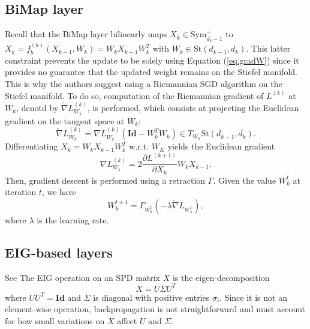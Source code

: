 \documentclass[10pt,a4paper]{book}
\theoremstyle{definition}
\theoremstyle{plain}
\theoremstyle{remark}
\newcommand{\Id}{\mathrm{\textbf{Id}}}
\newcommand \Stif {\textrm{St}}
\begin{document}
\subsection{BiMap layer}
Recall that the BiMap layer bilinearly maps $X_k \in \text{Sym}_{d_k-1}^{+}$ to $X_k=f_{b}^{(k)}(X_{k-1},W_k)=W_kX_{k-1}W_k^T$ with 
$W_k \in \Stif(d_{k-1},d_k)$. This latter constraint prevents the update to be solely using Equation (\ref{eq.gradW}) since it provides no guarantee that the updated weight remains on the Stiefel manifold.
This is why the authors suggest using a Riemannian SGD algorithm on the Stiefel manifold.
To do so, computation of the Riemannian gradient of $L^{(k)}$ at $W_k$, denotd by $\tilde{\nabla} L^{(k)}_{W_k}$, is performed, which consists at projecting the Euclidean gradient on the tangent space at $W_k$:
$$\tilde{\nabla} L^{(k)}_{W_k}=\nabla L^{(k)}_{W_k}(\Id-W_k^T W_k) \in T_{W_k}\Stif(d_{k-1},d_k).$$
Differentiating $X_k=W_kX_{k-1}W_k^T$ w.r.t. $W_K$ yields the Euclidean gradient
$$\nabla L^{(k)}_{W_k}=2 \frac{\partial L^{(k+1)}}{\partial X_k}W_k X_{k-1}.$$
Then, gradient descent is performed using a retraction $\Gamma$. Given the value $W_k^{t}$ at iteration $t$, we have
$$W_{k}^{t+1}=\Gamma_{W_k^{t}}(-\lambda \tilde{\nabla}L_{W_k^t}),$$
where $\lambda$ is the learning rate.

\subsection{EIG-based layers}
See \cite{ionescu2015matrix}
The EIG operation on an SPD matrix $X$ is the eigen-decomposition 
\begin{equation}\label{eq.eig}
    X=U\Sigma U^T
\end{equation}
where $UU^T=\Id$ and $\Sigma$ is diagonal with positive entries $\sigma_i$. Since it is not an element-wise operation, backpropagation is not straightforward and must account for how small variations on $X$ affect $U$ and $\Sigma$. 
\end{document}
